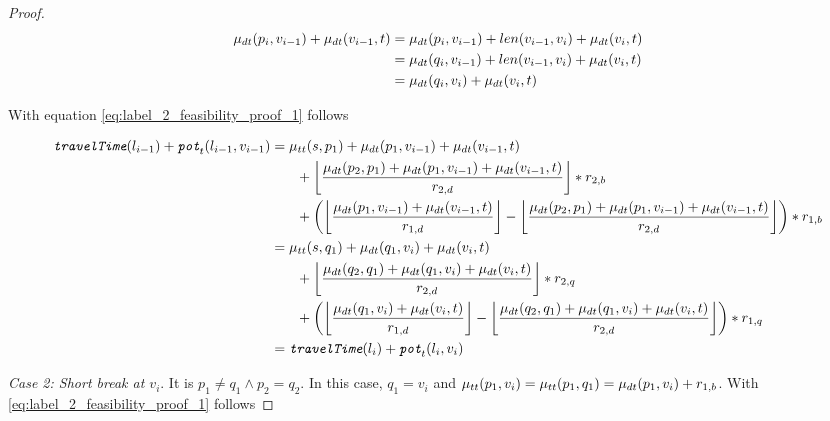 \begin{proof}
	\begin{align}
		\begin{split}\label{eq:label_2_feasibility_proof_2}
			\mu_{dt}(p_i,v_{i-1}) + \mu_{dt}(v_{i-1},t) & = \mu_{dt}(p_i,v_{i-1}) + len(v_{i-1},v_i) + \mu_{dt}(v_i,t) \\
			& = \mu_{dt}(q_i,v_{i-1}) + len(v_{i-1},v_i) + \mu_{dt}(v_i,t) \\
			& = \mu_{dt}(q_i,v_i) + \mu_{dt}(v_i,t)
		\end{split}
	\end{align}

	With equation \ref{eq:label_2_feasibility_proof_1} follows

	\begin{align}
		\begin{split}\label{eq:label_2_feasibility_proof_3}
			\concretett(l_{i-1}) + \concretepotential_t(l_{i-1},v_{i-1}) &= \traveltime(s, p_1) + \drivingtime(p_1,v_{i-1}) + \drivingtime(v_{i-1},t)\\
			& \phantom{{}=1} + \floor*{ \frac{\drivingtime(p_2,p_1) + \drivingtime(p_1,v_{i-1}) + \drivingtime(v_{i-1},t)}{\restr_{2,d}} } * \restr_{2,b}\\
			& \phantom{{}=1} + \left( \floor*{ \frac{\drivingtime(p_1,v_{i-1})  + \drivingtime(v_{i-1},t)}{\restr_{1,d}} } - \floor*{ \frac{\drivingtime(p_2,p_1) + \drivingtime(p_1,v_{i-1}) + \drivingtime(v_{i-1},t)}{\restr_{2,d}} }\right) * \restr_{1,b}\\
			&= \traveltime(s, q_1) + \drivingtime(q_1,v_{i}) + \drivingtime(v_{i},t)\\
			& \phantom{{}=1} + \floor*{ \frac{\drivingtime(q_2,q_1) + \drivingtime(q_1,v_{i}) + \drivingtime(v_{i},t)}{\restr_{2,d}} } * \restr_{2,q}\\
			& \phantom{{}=1} + \left( \floor*{ \frac{\drivingtime(q_1,v_{i})  + \drivingtime(v_{i},t)}{\restr_{1,d}} } - \floor*{ \frac{\drivingtime(q_2,q_1) + \drivingtime(q_1,v_{i}) + \drivingtime(v_{i},t)}{\restr_{2,d}} }\right) * \restr_{1,q}\\
			&=\concretett(l_{i}) + \concretepotential_t(l_{i},v_{i})
		\end{split}
	\end{align}

	\emph{Case 2: Short break at $v_i$}. It is $p_1 \neq q_1 \land p_2 = q_2$. In this case, $q_1 = v_i$ and $\mu_{tt}(p_1,v_i) = \mu_{tt}(p_1,q_1) = \mu_{dt}(p_1,v_i) + r_{1,b}$. With \ref{eq:label_2_feasibility_proof_1} follows


\end{proof}
